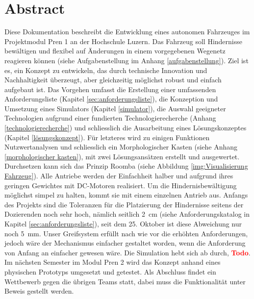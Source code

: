 \newpage
\section{Abstract}

Diese Dokumentation beschreibt die Entwicklung eines autonomen Fahrzeuges im Projektmodul Pren 1 an der Hochschule Luzern. Das Fahrzeug soll Hindernisse bewältigen und flexibel auf Änderungen in einem vorgegebenen Wegenetz reagieren können (siehe Aufgabenstellung im Anhang \ref{aufgabenstellung}). Ziel ist es, ein Konzept zu entwickeln, das durch technische Innovation und Nachhaltigkeit überzeugt, aber gleichzeitig möglichst robust und einfach aufgebaut ist.
Das Vorgehen umfasst die Erstellung einer umfassenden Anforderungsliste (Kapitel \ref{sec:anforderungsliste}), die Konzeption und Umsetzung eines Simulators (Kapitel \ref{simulator}), die Auswahl geeigneter Technologien aufgrund einer fundierten Technologierecherche (Anhang \ref{technologierecherche}) und schliesslich die Ausarbeitung eines Lösungskonzeptes (Kapitel \ref{lösungskonzept}). Für letzteres wird zu einigen Funktionen Nutzwertanalysen und schliesslich ein Morphologischer Kasten (siehe Anhang \ref{morphologischer kasten}), mit zwei Lösungsansätzen erstellt und ausgewertet. Durchsetzen kann sich das Prinzip Roomba (siehe Abbildung \ref{img:Visualisierung Fahrzeug}). Alle Antriebe werden der Einfachheit halber und aufgrund ihres geringen Gewichtes mit DC-Motoren realisiert. Um die Hindernisbewältigung möglichst simpel zu halten, kommt sie mit einem einzelnen Antrieb aus. Anfangs des Projekts sind die Toleranzen für die Platzierung der Hindernisse seitens der Dozierenden noch sehr hoch, nämlich seitlich 2 cm (siehe Anforderungskatalog in Kapitel \ref{sec:anforderungsliste}), seit dem 25. Oktober ist diese Abweichung nur noch 5 mm. Unser Greifsystem erfüllt nach wie vor die erhöhten Anforderungen, jedoch wäre der Mechanismus einfacher gestaltet worden, wenn die Anforderung von Anfang an einfacher gewesen wäre.
Die Simulation hebt sich ab durch, \textcolor{red}{\textbf{Todo}}. 
Im nächsten Semester im Modul Pren 2 wird das Konzept anhand eines physischen Prototyps umgesetzt und getestet. Als Abschluss findet ein Wettbewerb gegen die übrigen Teams statt, dabei muss die Funktionalität unter Beweis gestellt werden.

